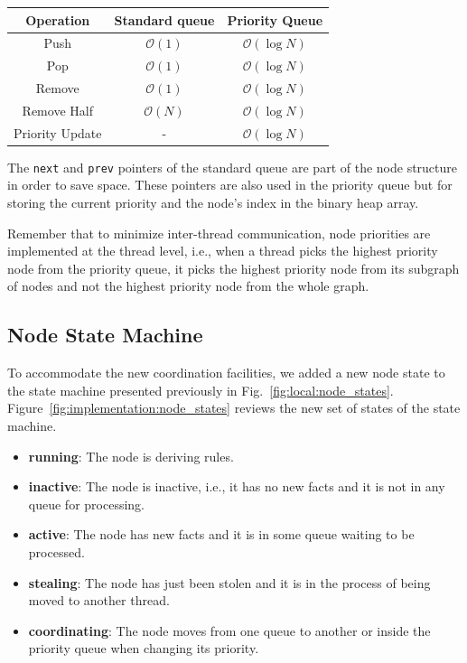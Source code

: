 \begin{table}[h]
   \begin{tabular}{| c | c | c |}
      \hline
      \textbf{Operation} & \textbf{Standard queue} & \textbf{Priority Queue} \\
      \hline
      Push & $\mathcal{O}(1)$ & $\mathcal{O}(\log{N})$ \\ \hline
      Pop & $\mathcal{O}(1)$ & $\mathcal{O}(\log{N})$ \\ \hline
      Remove & $\mathcal{O}(1)$ & $\mathcal{O}(\log{N})$ \\ \hline
      Remove Half & $\mathcal{O}(N)$ & $\mathcal{O}(\log{N})$ \\ \hline
      Priority Update & - & $\mathcal{O}(\log{N})$ \\ \hline
   \end{tabular}
   \label{fig:implementation:table_queue}
\end{table}

The \texttt{next} and \texttt{prev} pointers of the standard queue are part of
the node structure in order to save space. These pointers are also used in the
priority queue but for storing the current priority and the node's index in the binary
heap array. 

Remember that to minimize inter-thread communication, node priorities are
implemented at the thread level, i.e., when a thread picks the highest priority
node from the priority queue, it picks the highest priority node from its
subgraph of nodes and not the highest priority node from the whole graph.

\subsection{Node State Machine}\label{sec:node_state_machine}

To accommodate the new coordination facilities, we added a new node state to the
state machine presented previously in Fig.~\ref{fig:local:node_states}.
Figure~\ref{fig:implementation:node_states} reviews the new set of states of
the state machine.

\begin{itemize}
   \item \textbf{running}: The node is deriving rules.
   \item \textbf{inactive}: The node is inactive, i.e., it has no new facts and
      it is not in any
   queue for processing.
   \item \textbf{active}: The node has new facts and it is in some queue waiting
   to be processed.
   \item \textbf{stealing}: The node has just been stolen and it is in the process of being
   moved to another thread.
   \item \textbf{coordinating}: The node moves from one queue to another or
      inside the priority queue when changing its priority.
\end{itemize}

